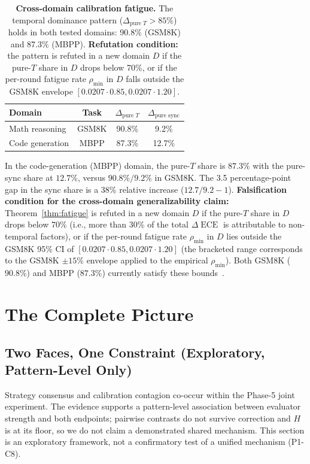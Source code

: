 \documentclass[11pt]{article}
\DeclareMathOperator{\ECE}{ECE}
\begin{document}
\begin{table}[H]
\centering
\caption{\textbf{Cross-domain calibration fatigue.} The temporal dominance pattern ($\Delta_{\text{pure } T} > 85\%$) holds in both tested domains: 90.8\% (GSM8K) and 87.3\% (MBPP). \textbf{Refutation condition:} the pattern is refuted in a new domain $D$ if the pure-$T$ share in $D$ drops below 70\%, or if the per-round fatigue rate $\rho_{\min}$ in $D$ falls outside the GSM8K envelope $[0.0207 \cdot 0.85, 0.0207 \cdot 1.20]$.}
\begin{tabular}{@{}lccc@{}}
\toprule
Domain & Task & $\Delta_{\text{pure } T}$ & $\Delta_{\text{pure sync}}$ \\
\midrule
Math reasoning & GSM8K & 90.8\% & 9.2\% \\
Code generation & MBPP & 87.3\% & 12.7\% \\
\bottomrule
\end{tabular}
\end{table}

In the code-generation (MBPP) domain, the pure-$T$ share is $87.3\%$ with the pure-sync share at $12.7\%$, versus $90.8\% / 9.2\%$ in GSM8K. The 3.5 percentage-point gap in the sync share is a 38\% relative increase ($12.7 / 9.2 - 1$). \textbf{Falsification condition for the cross-domain generalizability claim:} Theorem~\ref{thm:fatigue} is refuted in a new domain $D$ if the pure-$T$ share in $D$ drops below 70\% (i.e., more than 30\% of the total $\Delta\ECE$ is attributable to non-temporal factors), or if the per-round fatigue rate $\rho_{\min}$ in $D$ lies outside the GSM8K 95\% CI of $[0.0207 \cdot 0.85, 0.0207 \cdot 1.20]$ (the bracketed range corresponds to the GSM8K $\pm 15\%$ envelope applied to the empirical $\rho_{\min}$). Both GSM8K ($90.8\%$) and MBPP ($87.3\%$) currently satisfy these bounds~\citep{sun2020test,liu2026temporal}.

\section{The Complete Picture}

\subsection{Two Faces, One Constraint (Exploratory, Pattern-Level Only)}

Strategy consensus and calibration contagion co-occur within the Phase-5 joint experiment. The evidence supports a pattern-level association between evaluator strength and both endpoints; pairwise contrasts do not survive correction and $H$ is at its floor, so we do not claim a demonstrated shared mechanism. This section is an exploratory framework, not a confirmatory test of a unified mechanism (P1-C8).
\end{document}
